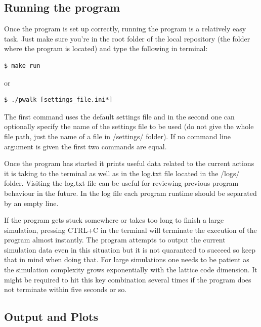 \documentclass[english,12pt,a4paper,pdftex,sci,utf8]{aaltothesis}
\begin{document}
\subsection{Running the program}

Once the program is set up correctly, running the program is a relatively easy task. Just make sure you're in the root folder of the local repository (the folder where the program is located) and type the following in terminal:
\begin{verbatim}
$ make run
\end{verbatim}
or
\begin{verbatim}
$ ./pwalk [settings_file.ini*]
\end{verbatim}

\noindent The first command uses the default settings file and in the second one can optionally specify the name of the settings file to be used (do not give the whole file path, just the name of a file in /settings/ folder). If no command line argument is given the first two commands are equal. %
\par Once the program has started it prints useful data related to the current actions it is taking to the terminal as well as in the log.txt file located in the /logs/ folder. Visiting the log.txt file can be useful for reviewing previous program behaviour in the future. In the log file each program runtime should be separated by an empty line.
\par If the program gets stuck somewhere or takes too long to finish a large simulation, pressing CTRL+C in the terminal will terminate the execution of the program almost instantly. The program attempts to output the current simulation data even in this situation but it is not quaranteed to succeed so keep that in mind when doing that. For large simulations one needs to be patient as the simulation complexity grows exponentially with the lattice code dimension. It might be required to hit this key combination several times if the program does not terminate within five seconds or so.

\subsection{Output and Plots}
\end{document}

